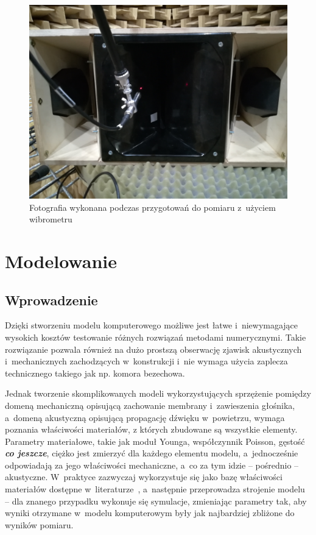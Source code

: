 \documentclass[12pt]{oska}
\newcommand{\comment}[1]{{\color{magenta}\emph{\textbf{#1}}}}
\begin{document}
			\begin{figure}[!ht]
				\centering
				\includegraphics[width=.8\textwidth]{zdjecie_wibro.jpg}
				\caption{Fotografia wykonana podczas przygotowań do pomiaru z~użyciem wibrometru}
				\label{r:wibro_zdjecie}
			\end{figure}


\section{Modelowanie}
	
	\subsection{Wprowadzenie}
	
		Dzięki stworzeniu modelu komputerowego możliwe jest łatwe i~niewymagające wysokich kosztów testowanie różnych rozwiązań metodami numerycznymi. Takie rozwiązanie pozwala również na dużo prostszą obserwację zjawisk akustycznych i~mechanicznych zachodzących w~konstrukcji i~nie wymaga użycia zaplecza technicznego takiego jak np. komora bezechowa. 
		
		Jednak tworzenie skomplikowanych modeli wykorzystujących sprzężenie pomiędzy domeną mechaniczną opisującą zachowanie membrany i~zawieszenia głośnika, a~domeną akustyczną opisującą propagację dźwięku w~powietrzu, wymaga poznania właściwości materiałów, z których zbudowane są wszystkie elementy. Parametry materiałowe, takie jak moduł Younga, współczynnik Poisson, gęstość \comment{co jeszcze}, ciężko jest zmierzyć dla każdego elementu modelu, a~jednocześnie odpowiadają za jego właściwości mechaniczne, a~co za tym idzie -- pośrednio -- akustyczne. W~praktyce zazwyczaj wykorzystuje się jako bazę właściwości materiałów dostępne w~literaturze~\cite{modelowanie}, a~następnie przeprowadza strojenie modelu -- dla znanego przypadku wykonuje się symulacje, zmieniając parametry tak, aby wyniki otrzymane w~modelu komputerowym były jak najbardziej zbliżone do wyników pomiaru.
		
\end{document}
